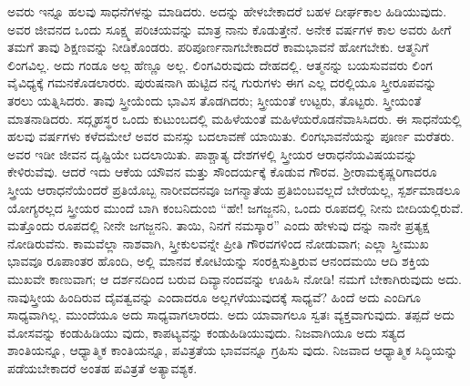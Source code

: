 ಅವರು ಇನ್ನೂ ಹಲವು ಸಾಧನೆಗಳನ್ನು ಮಾಡಿದರು. ಅದನ್ನು ಹೇಳಬೇಕಾದರೆ ಬಹಳ ದೀರ್ಘಕಾಲ ಹಿಡಿಯುವುದು. ಅವರ ಜೀವನದ ಒಂದು ಸೂಕ್ಷ್ಮ ಪರಿಚಯವನ್ನು ಮಾತ್ರ ನಾನು ಕೊಡುತ್ತೇನೆ. ಅನೇಕ ವರ್ಷಗಳ ಕಾಲ ಅವರು ಹೀಗೆ ತಮಗೆ ತಾವು ಶಿಕ್ಷಣವನ್ನು ನೀಡಿಕೊಂಡರು. ಪರಿಪೂರ್ಣನಾಗಬೇಕಾದರೆ ಕಾಮಭಾವನೆ ಹೋಗಬೇಕು. ಆತ್ಮನಿಗೆ ಲಿಂಗವಿಲ್ಲ. ಅದು ಗಂಡೂ ಅಲ್ಲ ಹೆಣ್ಣೂ ಅಲ್ಲ. ಲಿಂಗವಿರುವುದು ದೇಹದಲ್ಲಿ. ಆತ್ಮನನ್ನು ಬಯಸುವವರು ಲಿಂಗ ವೈವಿಧ್ಯಕ್ಕೆ ಗಮನಕೊಡಲಾರರು. ಪುರುಷನಾಗಿ ಹುಟ್ಟಿದ ನನ್ನ ಗುರುಗಳು ಈಗ ಎಲ್ಲ ದರಲ್ಲಿಯೂ ಸ್ತ್ರೀರೂಪವನ್ನು ತರಲು ಯತ್ನಿಸಿದರು. ತಾವು ಸ್ತ್ರೀಯೆಂದು ಭಾವಿಸ ತೊಡಗಿದರು; ಸ್ತ್ರೀಯಂತೆ ಉಟ್ಟರು, ತೊಟ್ಟರು. ಸ್ತ್ರೀಯಂತೆ ಮಾತನಾಡಿದರು. ಸದ್ಗೃಹಸ್ಥರ ಒಂದು ಕುಟುಂಬದಲ್ಲಿ ಮಹಿಳೆಯಂತೆ ಮಹಿಳೆಯರೊಡನೆವಾಸಿಸಿದರು. ಈ ಸಾಧನೆಯಲ್ಲಿ ಹಲವು ವರ್ಷಗಳು ಕಳೆದಮೇಲೆ ಅವರ ಮನಸ್ಸು ಬದಲಾವಣೆ ಯಾಯಿತು. ಲಿಂಗಭಾವನೆಯನ್ನು ಪೂರ್ಣ ಮರೆತರು. ಅವರ ಇಡೀ ಜೀವನ ದೃಷ್ಟಿಯೇ ಬದಲಾಯಿತು. ಪಾಶ್ಚಾತ್ಯ ದೇಶಗಳಲ್ಲಿ ಸ್ತ್ರೀಯರ ಆರಾಧನೆಯವಿಷಯವನ್ನು ಕೇಳಿರುವೆವು. ಆದರೆ ಇದು ಆಕೆಯ ಯೌವನ ಮತ್ತು ಸೌಂದರ್ಯಕ್ಕೆ ಕೊಡುವ ಗೌರವ. ಶ‍್ರೀರಾಮಕೃಷ್ಣರಿಗಾದರೂ ಸ್ತ್ರೀಯ ಆರಾಧನೆಯೆಂದರೆ ಪ್ರತಿಯೊಬ್ಬ ನಾರೀವದನವೂ ಜಗನ್ಮಾತೆಯ ಪ್ರತಿಬಿಂಬವಲ್ಲದೆ ಬೇರೆಯಲ್ಲ, ಸ್ಪರ್ಶಮಾಡಲೂ ಯೋಗ್ಯರಲ್ಲದ ಸ್ತ್ರೀಯರ ಮುಂದೆ ಬಾಗಿ ಕಂಬನಿದುಂಬಿ “ಹೇ! ಜಗಜ್ಜನನಿ, ಒಂದು ರೂಪದಲ್ಲಿ ನೀನು ಬೀದಿಯಲ್ಲಿರುವೆ. ಮತ್ತೊಂದು ರೂಪದಲ್ಲಿ ನೀನೇ ಜಗಜ್ಜನನಿ. ತಾಯಿ, ನಿನಗೆ ನಮಸ್ಕಾರ” ಎಂದು ಹೇಳುವು ದನ್ನು ನಾನೇ ಪ್ರತ್ಯಕ್ಷ ನೋಡಿರುವೆನು. ಕಾಮವೆಲ್ಲಾ ನಾಶವಾಗಿ, ಸ್ತ್ರೀಕುಲವನ್ನೇ ಪ್ರೀತಿ ಗೌರವಗಳಿಂದ ನೋಡುವಾಗ; ಎಲ್ಲಾ ಸ್ತ್ರೀಮುಖ ಭಾವವೂ ರೂಪಾಂತರ ಹೊಂದಿ, ಅಲ್ಲಿ ಮಾನವ ಕೋಟಿಯನ್ನು ಸಂರಕ್ಷಿಸುತ್ತಿರುವ ಆನಂದಮಯಿ ಆದಿ ಶಕ್ತಿಯ ಮುಖವೇ ಕಾಣುವಾಗ; ಆ ದರ್ಶನದಿಂದ ಬರುವ ದಿವ್ಯಾನಂದವನ್ನು ಊಹಿಸಿ ನೋಡಿ! ನಮಗೆ ಬೇಕಾಗಿರುವುದು ಅದು. ನಾವುಸ್ತ್ರೀಯ ಹಿಂದಿರುವ ದೈವತ್ವವನ್ನು ಎಂದಾದರೂ ಅಲ್ಲಗಳೆಯುವುದಕ್ಕೆ ಸಾಧ್ಯವೆ? ಹಿಂದೆ ಅದು ಎಂದಿಗೂ ಸಾಧ್ಯವಾಗಿಲ್ಲ. ಮುಂದೆಯೂ ಅದು ಸಾಧ್ಯವಾಗಲಾರದು. ಅದು ಯಾವಾಗಲೂ ಸ್ವತಃ ವ್ಯಕ್ತವಾಗುವುದು. ತಪ್ಪದೆ ಅದು ಮೋಸವನ್ನು ಕಂಡುಹಿಡಿಯು ವುದು, ಕಾಪಟ್ಯವನ್ನು ಕಂಡುಹಿಡಿಯುವುದು. ನಿಜವಾಗಿಯೂ ಅದು ಸತ್ಯದ ಶಾಂತಿಯನ್ನೂ, ಆಧ್ಯಾತ್ಮಿಕ ಕಾಂತಿಯನ್ನೂ, ಪವಿತ್ರತೆಯ ಭಾವವನ್ನೂ ಗ್ರಹಿಸು ವುದು. ನಿಜವಾದ ಆಧ್ಯಾತ್ಮಿಕ ಸಿದ್ಧಿಯನ್ನು ಪಡೆಯಬೇಕಾದರೆ ಅಂತಹ ಪವಿತ್ರತೆ ಅತ್ಯಾವಶ್ಯಕ.

